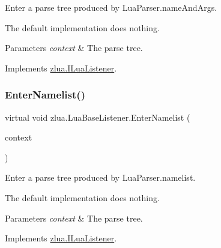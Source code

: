 Enter a parse tree produced by Lua\+Parser.\+name\+And\+Args. 

The default implementation does nothing.


\begin{DoxyParams}{Parameters}
{\em context} & The parse tree.\\
\hline
\end{DoxyParams}


Implements \mbox{\hyperlink{interfacezlua_1_1_i_lua_listener_a55b4f82ec10a24203046b5f3e9cadfe6}{zlua.\+I\+Lua\+Listener}}.

\mbox{\label{classzlua_1_1_lua_base_listener_a7e9f223eea630cb4d7deac2257225a75}} 
\subsubsection{\texorpdfstring{Enter\+Namelist()}{EnterNamelist()}}
{\footnotesize\ttfamily virtual void zlua.\+Lua\+Base\+Listener.\+Enter\+Namelist (\begin{DoxyParamCaption}\item[{\mbox{[}\+Not\+Null\mbox{]} \mbox{\hyperlink{classzlua_1_1_lua_parser_1_1_namelist_context}{Lua\+Parser.\+Namelist\+Context}}}]{context }\end{DoxyParamCaption})\hspace{0.3cm}{\ttfamily [virtual]}}



Enter a parse tree produced by Lua\+Parser.\+namelist. 

The default implementation does nothing.


\begin{DoxyParams}{Parameters}
{\em context} & The parse tree.\\
\hline
\end{DoxyParams}


Implements \mbox{\hyperlink{interfacezlua_1_1_i_lua_listener_ad550fd673f32ad3d88572e1781551e41}{zlua.\+I\+Lua\+Listener}}.

\mbox{\label{classzlua_1_1_lua_base_listener_acf401fd123113e2bfdaf5c5390d81871}} 
